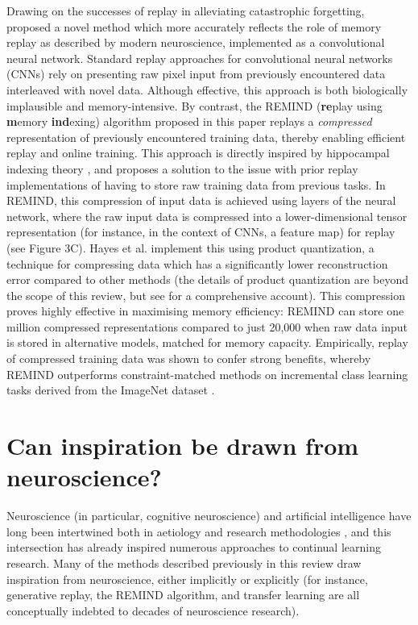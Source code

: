 \documentclass{article} %
\begin{document}
Drawing on the successes of replay in alleviating catastrophic forgetting, \citet{hayes2020remind} proposed a novel method which more accurately reflects the role of memory replay as described by modern neuroscience, implemented as a convolutional neural network. Standard replay approaches for convolutional neural networks (CNNs) rely on presenting raw pixel input from previously encountered data interleaved with novel data. Although effective, this approach is both biologically implausible and memory-intensive. By contrast, the REMIND (\textbf{re}play using \textbf{m}emory \textbf{ind}exing) algorithm proposed in this paper replays a \textit{compressed} representation of previously encountered training data, thereby enabling efficient replay and online training. This approach is directly inspired by hippocampal indexing theory \citep{teyler2007hippocampal}, and proposes a solution to the issue with prior replay implementations of having to store raw training data from previous tasks. In REMIND, this compression of input data is achieved using layers of the neural network, where the raw input data is compressed into a lower-dimensional tensor representation (for instance, in the context of CNNs, a feature map) for replay (see Figure 3C). Hayes et al. implement this using product quantization, a technique for compressing data which has a significantly lower reconstruction error compared to other methods (the details of product quantization are beyond the scope of this review, but see \citet{jegou2010product} for a comprehensive account). This compression proves highly effective in maximising memory efficiency: REMIND can store one million compressed representations compared to just 20,000 when raw data input is stored in alternative models, matched for memory capacity. Empirically, replay of compressed training data was shown to confer strong benefits, whereby REMIND outperforms constraint-matched methods on incremental class learning tasks derived from the ImageNet dataset \citep{deng2009imagenet}.

\section*{Can inspiration be drawn from neuroscience?}

Neuroscience (in particular, cognitive neuroscience) and artificial intelligence have long been intertwined both in aetiology and research methodologies \citep{hassabis2017neuroscience,hinton1986learning}, and this intersection has already inspired numerous approaches to continual learning research. Many of the methods described previously in this review draw inspiration from neuroscience, either implicitly or explicitly (for instance, generative replay, the REMIND algorithm, and transfer learning are all conceptually indebted to decades of neuroscience research).
\end{document}
